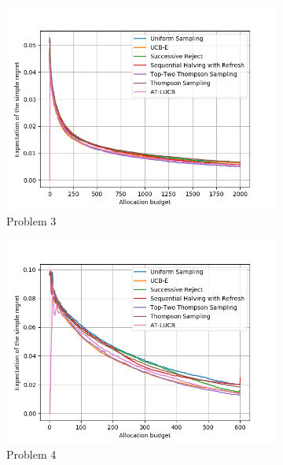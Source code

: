 \documentclass[twoside,11pt]{article}
\begin{document}
\begin{figure}[ht]
\begin{subfigure}[t]{0.2\textwidth}
    \centering\includegraphics[width=\textwidth]{img/bai/setting3.png}
    \caption{Problem 3}
  \end{subfigure}%
  \begin{subfigure}[t]{0.2\textwidth}
    \centering\includegraphics[width=\textwidth]{img/bai/setting4.png}
    \caption{Problem 4}
  \end{subfigure}
  \begin{subfigure}[t]{0.2\textwidth}

\end{subfigure}
\end{figure}
\end{document}
